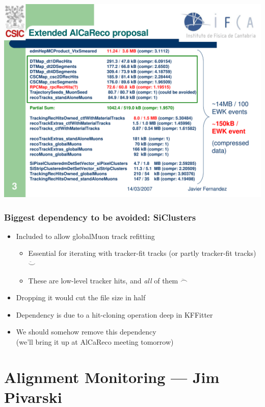 \documentclass[compress]{beamer}
\begin{document}
\begin{frame}
\includegraphics[width=\linewidth]{javier}
\end{frame}

\begin{frame}
\frametitle{Biggest dependency to be avoided: SiClusters}
\begin{itemize}\setlength{\itemsep}{0.5 cm}
\item Included to allow globalMuon track refitting
\begin{itemize}
\item Essential for iterating with tracker-fit tracks (or partly tracker-fit tracks) $\ddot{\smile}$
\item These are low-level tracker hits, and {\it all} of them $\ddot{\frown}$
\end{itemize}
\item Dropping it would cut the file size in half
\item Dependency is due to a hit-cloning operation deep in KFFitter
\item We should somehow remove this dependency \\ (we'll bring it up at AlCaReco meeting tomorrow)
\end{itemize}
\vfill
\end{frame}

\section*{Alignment Monitoring --- Jim Pivarski}
\end{document}
